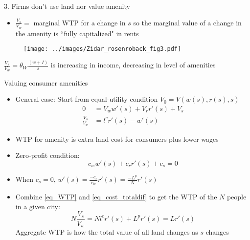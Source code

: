 \documentclass[11pt,notes=hide,aspectratio=169]{beamer}
\begin{document}
\begin{frame}{3. Firms don't use land nor value amenity}
\begin{itemize}
\item $\frac{V_s}{ V_w} =$ marginal WTP for a change in $s$ so the marginal value of a change in the amenity is ``fully capitalized" in rents
\end{itemize}
\begin{figure}
\texttt{[image: ../images/Zidar\_rosenroback\_fig3.pdf]}
\end{figure}
$\frac{V_s}{ V_w} = \theta_W \frac{\left(w + I\right)}{s}$ is increasing in income, decreasing in level of amenities
\end{frame}
\begin{frame}{Valuing consumer amenities}
\begin{itemize}
\item General case: Start from equal-utility condition $V_0 = V(w(s), r(s), s)$
\begin{align}
0 &= V_ww'(s) + V_r r'(s) + V_s
\nonumber \\
\frac{V_s}{V_w} 
&=
l^cr'(s) - w'(s) \label{eq_WTP}
\end{align}
\item WTP for amenity is extra land cost for consumers plus lower wages
\item Zero-profit condition:
\begin{equation}
c_w w'(s) + c_r r'(s) + c_s = 0 \label{eq_cost_totaldif}
\end{equation}
\item When $c_s = 0$, 
$w'(s) = \frac{-c_r}{c_w} r'(s) = \frac{-L^p}{N} r'(s)$
\item Combine \eqref{eq_WTP} and \eqref{eq_cost_totaldif} to get the WTP of the $N$ people in a given city:
\begin{equation*}
N \frac{V_s}{V_w} = N l^cr'(s) + L^p r'(s)  = L r'(s)
\end{equation*}
Aggregate WTP is how the total value of all land changes as $s$ changes
\end{itemize}
\end{frame}
\end{document}
